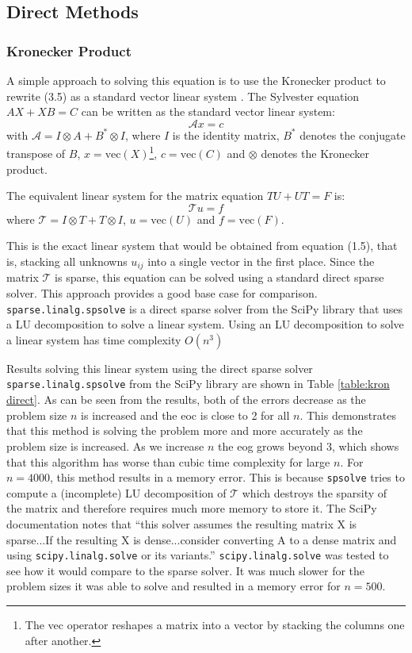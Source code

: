 \documentclass[11pt]{article}
\numberwithin{equation}{section}
\begin{document}
\subsection{Direct Methods}

\subsubsection{Kronecker Product}
A simple approach to solving this equation is to use the Kronecker product to rewrite (3.5) as a standard vector linear system \cite{Laub}. The Sylvester equation $AX + XB = C$ can be written as the standard vector linear system:
\begin{equation}
\mathcal{A}x = c
\end{equation}
with $\mathcal{A} = I \otimes A + B^* \otimes I$, where $I$ is the identity matrix, $B^*$ denotes the conjugate transpose of $B$, $x = \text{vec}(X)$\footnote{The vec operator reshapes a matrix into a vector by stacking the columns one after another.}, $c = \text{vec}(C)$ and $\otimes$ denotes the Kronecker product.

The equivalent linear system for the matrix equation $TU + UT = F$ is:
\begin{equation}
\mathcal{T}u = f
\end{equation}
where $\mathcal{T} = I \otimes T + T \otimes I$, $u = \text{vec}(U)$ and $f = \text{vec}(F)$.

This is the exact linear system that would be obtained from equation (1.5), that is, stacking all unknowns $u_{ij}$ into a single vector in the first place. Since the matrix $\mathcal{T}$ is sparse, this equation can be solved using a standard direct sparse solver. This approach provides a good base case for comparison. \texttt{sparse.linalg.spsolve} is a direct sparse solver from the SciPy library that uses a LU decomposition to solve a linear system. Using an LU decomposition to solve a linear system has time complexity $O(n^3)$

Results solving this linear system using the direct sparse solver \texttt{sparse.linalg.spsolve} from the SciPy library are shown in Table \ref{table:kron direct}. As can be seen from the results, both of the errors decrease as the problem size $n$ is increased and the eoc is close to 2 for all $n$. This demonstrates that this method is solving the problem more and more accurately as the problem size is increased. As we increase $n$ the eog grows beyond $3$, which shows that this algorithm has worse than cubic time complexity for large $n$. For $n=4000$, this method results in a memory error. This is because \texttt{spsolve} tries to compute a (incomplete) LU decomposition of $\mathcal{T}$ which destroys the sparsity of the matrix and therefore requires much more memory to store it. The SciPy documentation notes that ``this solver assumes the resulting matrix X is sparse...If the resulting X is dense...consider converting A to a dense matrix and using \texttt{scipy.linalg.solve} or its variants.'' \texttt{scipy.linalg.solve} was tested to see how it would compare to the sparse solver. It was much slower for the problem sizes it was able to solve and resulted in a memory error for $n=500$.
\end{document}
